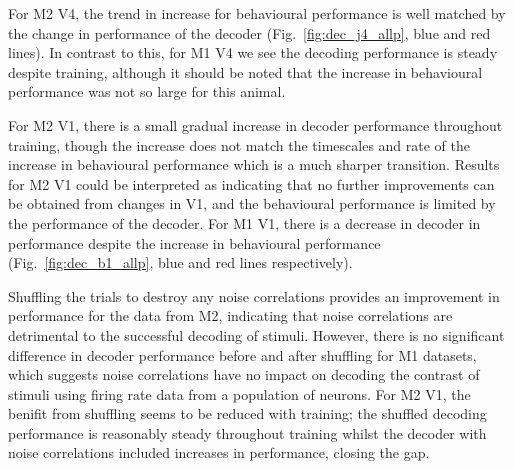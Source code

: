 For \ac{M2} \ac{V4}, the trend in increase for behavioural performance is well matched by the change in performance of the decoder (Fig.~\ref{fig:dec_j4_allp}, blue and red lines).
In contrast to this, for \ac{M1} \ac{V4} we see the decoding performance is steady despite training, although it should be noted that the increase in behavioural performance was not so large for this animal.

For \ac{M2} \ac{V1}, there is a small gradual increase in decoder performance throughout training, though the increase does not match the timescales and rate of the increase in behavioural performance which is a much sharper transition.
Results for \ac{M2} \ac{V1} could be interpreted as indicating that no further improvements can be obtained from changes in \ac{V1}, and the behavioural performance is limited by the performance of the decoder.
For \ac{M1} \ac{V1}, there is a decrease in decoder in performance despite the increase in behavioural performance (Fig.~\ref{fig:dec_b1_allp}, blue and red lines respectively).


Shuffling the trials to destroy any noise correlations provides an improvement in performance for the data from \ac{M2}, indicating that noise correlations are detrimental to the successful decoding of stimuli.
However, there is no significant difference in decoder performance before and after shuffling for \ac{M1} datasets, which suggests noise correlations have no impact on decoding the contrast of stimuli using firing rate data from a population of neurons.
For \ac{M2} \ac{V1}, the benifit from shuffling seems to be reduced with training; the shuffled decoding performance is reasonably steady throughout training whilst the decoder with noise correlations included increases in performance, closing the gap.



